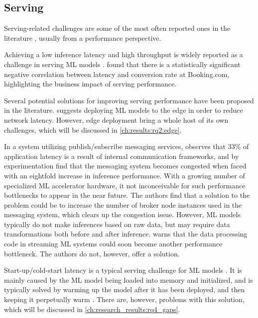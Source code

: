 \subsection{Serving}
Serving-related challenges are some of the most often reported ones in the literature \cite{Bosch2021, Richins2020, Li2017, Baylor2017, Garcia2020, Crankshaw2017, Lwakatare2019, Bernardi2019, Yadwadkar2019, Chahal2020, Choi2021, Zhang2020, Gupta2020}, usually from a performance perspective.

Achieving a low inference latency and high throughput is widely reported as a challenge in serving ML models \cite{Bosch2021, Li2017,Crankshaw2017,Lwakatare2019,Bernardi2019}.
\textcite{Bernardi2019} found that there is a statistically significant negative correlation between latency and conversion rate at Booking.com, highlighting the business impact of serving performance.

Several potential solutions for improving serving performance have been proposed in the literature.
\textcite{Gupta2020} suggests deploying ML models to the edge in order to reduce network latency. However, edge deployment bring a whole host of its own challenges, which will be discussed in \cref{ch:results:rq2:edge}.

In a system utilizing publish/subscribe messaging services, \cite{Richins2020} observes that 33\% of application latency is a result of internal communication frameworks, and by experimentation find that the messaging system becomes congested when faced with an eightfold increase in inference performance.
With a growing number of specialized ML accelerator hardware, it not inconceivable for such performance bottlenecks to appear in the near future.
The authors find that a solution to the problem could be to increase the number of broker node instances used in the messaging system, which clears up the congestion issue. However, ML models typically do not make inferences based on raw data, but may require data transformations both before and after inference.
\cite{Richins2020} warns that the data processing code in streaming ML systems could soon become another performance bottleneck.
The authors do not, however, offer a solution.

Start-up/cold-start latency is a typical serving challenge for ML models \cite{Yadwadkar2019}. It is mainly caused by the ML model being loaded into memory and initialized, and is typically solved by warming up the model after it has been deployed, and then keeping it perpetually warm \cite{Zhang2020}.
There are, however, problems with this solution, which will be discussed in \cref{ch:research_results:rq4_gaps}.

